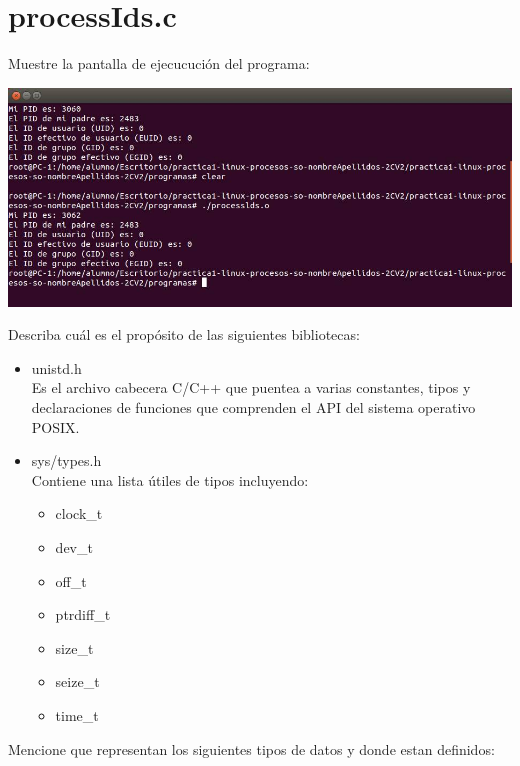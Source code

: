 \section{processIds.c}

	Muestre la pantalla de ejecucución del programa:

	\begin{center}
		\includegraphics[width=\linewidth]{imagenes/processIDs.png}
	\end{center}

	Describa cuál es el propósito de las siguientes bibliotecas:

	\begin{itemize}

		\item unistd.h\\
		Es el archivo cabecera C/C++ que puentea a varias constantes, tipos y declaraciones de funciones que comprenden el API del sistema operativo POSIX.
		\item sys/types.h\\
		Contiene una lista útiles de tipos incluyendo:
		\begin{itemize}
		\item clock\_t
		\item dev\_t
		\item off\_t
		\item ptrdiff\_t
		\item size\_t
		\item seize\_t
		\item time\_t
		\end{itemize}

	\end{itemize}

	Mencione que representan los siguientes tipos de datos y donde estan definidos:

